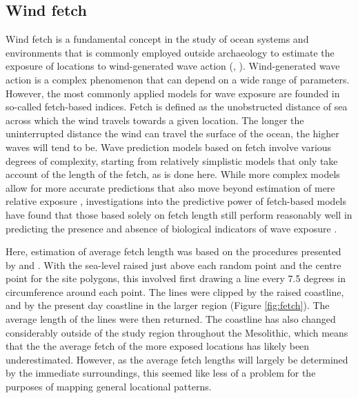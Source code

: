 \documentclass[12pt, a4paper]{article}
\begin{document}
\subsection{Wind fetch} 
Wind fetch is a fundamental concept in the study of ocean systems and environments that is commonly employed outside archaeology to estimate the exposure of locations to wind-generated wave action (\citealp[][]{laing1998}, \citealp[for archaeological applications see][]{nitter2013, nitter2018}). Wind-generated wave action is a complex phenomenon that can depend on a wide range of parameters. However, the most commonly applied models for wave exposure are founded in so-called fetch-based indices. Fetch is defined as the unobstructed distance of sea across which the wind travels towards a given location. The longer the uninterrupted distance the wind can travel the surface of the ocean, the higher waves will tend to be. Wave prediction models based on fetch involve various degrees of complexity, starting from relatively simplistic models that only take account of the length of the fetch, as is done here. While more complex models allow for more accurate predictions that also move beyond estimation of mere relative exposure \citep{malhotra2007, bekkby2008, sundblad2014}, investigations into the predictive power of fetch-based models have found that those based solely on fetch length still perform reasonably well in predicting the presence and absence of biological indicators of wave exposure \citep{burrows2008, hill2010}. \par
Here, estimation of average fetch length was based on the procedures presented by \cite{ekebom2003} and \cite{tolvanen2005}. With the sea-level raised just above each random point and the centre point for the site polygons, this involved first drawing a line every 7.5 degrees in circumference around each point. The lines were clipped by the raised coastline, and by the present day coastline in the larger region (Figure \ref{fig:fetch}). The average length of the lines were then returned. The coastline has also changed considerably outside of the study region throughout the Mesolithic, which means that the the average fetch of the more exposed locations has likely been underestimated. However, as the average fetch lengths will largely be determined by the immediate surroundings, this seemed like less of a problem for the purposes of mapping general locational patterns. \par
\end{document}
